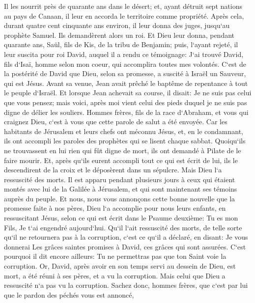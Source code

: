 \verse Il les nourrit près de quarante ans dans le désert; 
\verse et, ayant détruit sept nations au pays de Canaan, il leur en accorda le territoire comme propriété. 
\verse Après cela, durant quatre cent cinquante ans environ, il leur donna des juges, jusqu`au prophète Samuel. 
\verse Ils demandèrent alors un roi. Et Dieu leur donna, pendant quarante ans, Saül, fils de Kis, de la tribu de Benjamin; 
\verse puis, l`ayant rejeté, il leur suscita pour roi David, auquel il a rendu ce témoignage: J`ai trouvé David, fils d`Isaï, homme selon mon coeur, qui accomplira toutes mes volontés. 
\verse C`est de la postérité de David que Dieu, selon sa promesse, a suscité à Israël un Sauveur, qui est Jésus. 
\verse Avant sa venue, Jean avait prêché le baptême de repentance à tout le peuple d`Israël. 
\verse Et lorsque Jean achevait sa course, il disait: Je ne suis pas celui que vous pensez; mais voici, après moi vient celui des pieds duquel je ne suis pas digne de délier les souliers. 
\verse Hommes frères, fils de la race d`Abraham, et vous qui craignez Dieu, c`est à vous que cette parole de salut a été envoyée. 
\verse Car les habitants de Jérusalem et leurs chefs ont méconnu Jésus, et, en le condamnant, ils ont accompli les paroles des prophètes qui se lisent chaque sabbat. 
\verse Quoiqu`ils ne trouvassent en lui rien qui fût digne de mort, ils ont demandé à Pilate de le faire mourir. 
\verse Et, après qu`ils eurent accompli tout ce qui est écrit de lui, ils le descendirent de la croix et le déposèrent dans un sépulcre. 
\verse Mais Dieu l`a ressuscité des morts. 
\verse Il est apparu pendant plusieurs jours à ceux qui étaient montés avec lui de la Galilée à Jérusalem, et qui sont maintenant ses témoins auprès du peuple. 
\verse Et nous, nous vous annonçons cette bonne nouvelle que la promesse faite à nos pères, 
\verse Dieu l`a accomplie pour nous leurs enfants, en ressuscitant Jésus, selon ce qui est écrit dans le Psaume deuxième: Tu es mon Fils, Je t`ai engendré aujourd`hui. 
\verse Qu`il l`ait ressuscité des morts, de telle sorte qu`il ne retournera pas à la corruption, c`est ce qu`il a déclaré, en disant: Je vous donnerai Les grâces saintes promises à David, ces grâces qui sont assurées. 
\verse C`est pourquoi il dit encore ailleurs: Tu ne permettras pas que ton Saint voie la corruption. 
\verse Or, David, après avoir en son temps servi au dessein de Dieu, est mort, a été réuni à ses pères, et a vu la corruption. 
\verse Mais celui que Dieu a ressuscité n`a pas vu la corruption. 
\verse Sachez donc, hommes frères, que c`est par lui que le pardon des péchés vous est annoncé, 
